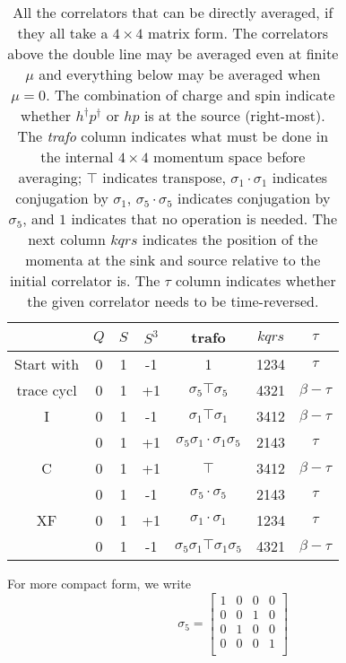 \begin{table}[h]
  \centering
  \begin{tabular}{c|cccccc}
             & $Q$ & $S$ & $S^3$ & trafo & $kqrs$    & $\tau$  \\
  \hline
  Start with & 0 & 1 & -1 & 1 & 1234 &  $\tau$  \\
  \hline
  trace cycl & 0 & 1 & +1 & $\sigma_5 \top \sigma_5$ & 4321 & $\beta-\tau$ \\
  \hline
  I          & 0 & 1 & -1 & $\sigma_1 \top \sigma_1$ & 3412 & $\beta-\tau$ \\
             & 0 & 1 & +1 & $\sigma_5\sigma_1\cdot\sigma_1\sigma_5$ & 2143 & $\tau$ \\
  \hline\hline
  C          & 0 & 1 & +1 & $\top$ & 3412 & $\beta-\tau$ \\
             & 0 & 1 & -1 & $\sigma_5\cdot\sigma_5$ & 2143 & $\tau$ \\
  \hline
  XF         & 0 & 1 & +1 & $\sigma_1\cdot\sigma_1$ & 1234 & $\tau$ \\
             & 0 & 1 & -1 & $\sigma_5\sigma_1\top\sigma_1\sigma_5$ & 4321 & $\beta-\tau$
  \end{tabular}
  \caption{All the correlators that can be directly averaged, if they all take a $4 \times 4$ matrix form. The correlators above the double line may be averaged even at finite $\mu$ and everything below may be averaged when $\mu = 0$. The combination of charge and spin indicate whether $h^\dagger p^\dagger$ or $hp$ is at the source (right-most). The \textit{trafo} column indicates what must be done in the internal $4 \times 4$ momentum space before averaging; $\top$ indicates transpose, $\sigma_1\cdot\sigma_1$ indicates conjugation by $\sigma_1$, $\sigma_5\cdot\sigma_5$ indicates conjugation by $\sigma_5$, and $1$ indicates that no operation is needed. The next column $kqrs$ indicates the position of the momenta at the sink and source relative to the initial correlator is. The $\tau$ column indicates whether the given correlator needs to be time-reversed.}
  \label{tab:phhp}
\end{table}

For more compact form, we write
\\
\begin{equation}
 \sigma_5 = \left[ {\begin{array}{cccc}
    1 & 0 & 0 & 0 \\
    0 & 0 & 1 & 0 \\
    0 & 1 & 0 & 0 \\
    0 & 0 & 0 & 1 \\
  \end{array} } \right]
\end{equation}

